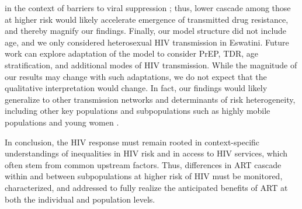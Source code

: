 in the context of barriers to viral suppression \cite{Pham2014};
thus, lower cascade among those at higher risk
would likely accelerate emergence of transmitted drug resistance,
and thereby magnify our findings.
Finally, our model structure did not include age,
and we only considered heterosexual HIV transmission in Eswatini.
Future work can explore adaptation of the model to consider
PrEP, TDR, age stratification, and additional modes of HIV transmission.
While the magnitude of our results may change with such adaptations,
we do not expect that the qualitative interpretation would change.
In fact, our findings would likely generalize
to other transmission networks and determinants of risk heterogeneity,
including other key populations and subpopulations such as
highly mobile populations and young women \cite{Camlin2019,Cheuk2020}.
\par
In conclusion, the HIV response must remain rooted in
context-specific understandings of inequalities in HIV risk and in access to HIV services,
which often stem from common upstream factors.
Thus, differences in ART cascade within and between subpopulations at higher risk of HIV
must be monitored, characterized, and addressed
to fully realize the anticipated benefits of ART
at both the individual and population levels.

